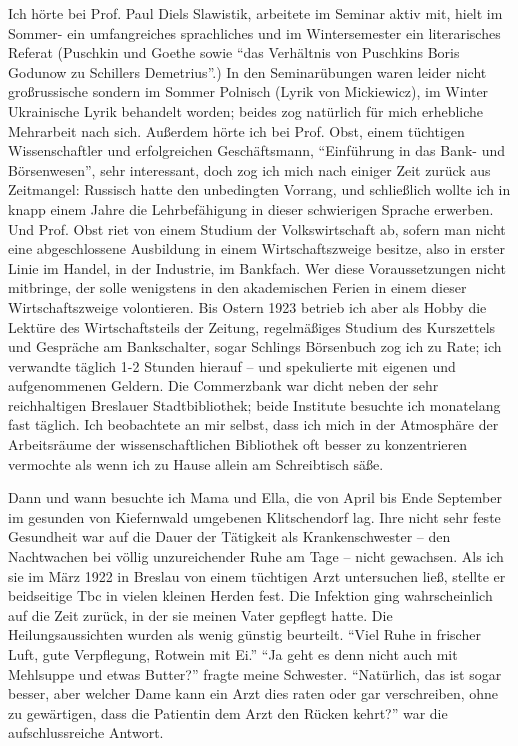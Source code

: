 Ich hörte bei Prof. Paul Diels Slawistik, arbeitete im Seminar aktiv mit, hielt im Sommer- ein umfangreiches sprachliches und im Wintersemester ein literarisches Referat (Puschkin und Goethe sowie \enquote{das Verhältnis von Puschkins Boris Godunow zu Schillers Demetrius}.) In den Seminarübungen waren leider nicht großrussische sondern im Sommer Polnisch (Lyrik von Mickiewicz), im Winter Ukrainische Lyrik behandelt worden; beides zog natürlich für mich erhebliche Mehrarbeit nach sich. Außerdem hörte ich bei Prof. Obst, einem tüchtigen Wissenschaftler und erfolgreichen Geschäftsmann, \enquote{Einführung in das Bank- und Börsenwesen}, sehr interessant, doch zog ich mich nach einiger Zeit zurück aus Zeitmangel: Russisch hatte den unbedingten Vorrang, und schließlich wollte ich in knapp einem Jahre die Lehrbefähigung in dieser schwierigen Sprache erwerben. Und Prof. Obst riet von einem Studium der Volkswirtschaft ab, sofern man nicht eine abgeschlossene Ausbildung in einem Wirtschaftszweige besitze, also in erster Linie im Handel, in der Industrie, im Bankfach. Wer diese Voraussetzungen nicht mitbringe, der solle wenigstens in den akademischen Ferien in einem dieser Wirtschaftszweige volontieren. Bis Ostern 1923 betrieb ich aber als Hobby die Lektüre des Wirtschaftsteils der Zeitung, regelmäßiges Studium des Kurszettels und Gespräche am Bankschalter, sogar Schlings Börsenbuch zog ich zu Rate; ich verwandte täglich 1-2 Stunden hierauf -- und spekulierte mit eigenen und aufgenommenen Geldern. Die Commerzbank war dicht neben der sehr reichhaltigen Breslauer Stadtbibliothek; beide Institute besuchte ich monatelang fast täglich. Ich beobachtete an mir selbst, dass ich mich in der Atmosphäre der Arbeitsräume der wissenschaftlichen Bibliothek oft besser zu konzentrieren vermochte als wenn ich zu Hause allein am Schreibtisch säße.

Dann und wann besuchte ich Mama und Ella, die von April bis Ende September im gesunden von Kiefernwald umgebenen Klitschendorf lag. Ihre nicht sehr feste Gesundheit war auf die Dauer der Tätigkeit als Krankenschwester -- den Nachtwachen bei völlig unzureichender Ruhe am Tage -- nicht gewachsen. Als ich sie im März 1922 in Breslau von einem tüchtigen Arzt untersuchen ließ, stellte er beidseitige Tbc in vielen kleinen Herden fest. Die Infektion ging wahrscheinlich auf die Zeit zurück, in der sie meinen Vater gepflegt hatte. Die Heilungsaussichten wurden als wenig günstig beurteilt. \enquote{Viel Ruhe in frischer Luft, gute Verpflegung, Rotwein mit Ei.} \enquote{Ja geht es denn nicht auch mit Mehlsuppe und etwas Butter?} fragte meine Schwester. \enquote{Natürlich, das ist sogar besser, aber welcher Dame kann ein Arzt dies raten oder gar verschreiben, ohne zu gewärtigen, dass die Patientin dem Arzt den Rücken kehrt?} war die aufschlussreiche Antwort.

